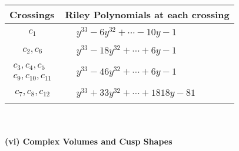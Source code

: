\documentclass[1p]{elsarticle_modified}
\theoremstyle{definition}
\begin{document}
\begin{tabular}{m{50pt}|m{274pt}}
Crossings & \hspace{64pt}Riley Polynomials at each crossing \\
\hline $$\begin{aligned}c_{1}\end{aligned}$$&$\begin{aligned}
&y^{33}-6 y^{32}+\cdots-10 y-1
\end{aligned}$\\
\hline $$\begin{aligned}c_{2},c_{6}\end{aligned}$$&$\begin{aligned}
&y^{33}-18 y^{32}+\cdots+6 y-1
\end{aligned}$\\
\hline $$\begin{aligned}c_{3},c_{4},c_{5}\\c_{9},c_{10},c_{11}\end{aligned}$$&$\begin{aligned}
&y^{33}-46 y^{32}+\cdots+6 y-1
\end{aligned}$\\
\hline $$\begin{aligned}c_{7},c_{8},c_{12}\end{aligned}$$&$\begin{aligned}
&y^{33}+33 y^{32}+\cdots+1818 y-81
\end{aligned}$\\
\hline
\end{tabular}\\~\\
\newpage\flushleft \textbf{(vi) Complex Volumes and Cusp Shapes}
\end{document}
